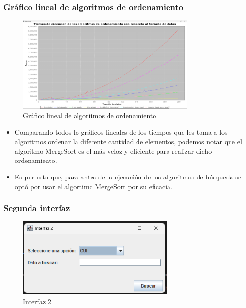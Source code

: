 \documentclass{article}
\begin{document}
    \subsubsection{Gráfico lineal de algoritmos de ordenamiento}
    
     \begin{figure}[H]
        \centering
	\includegraphics[width=0.8\textwidth,keepaspectratio]{img/Sort_Grafic.png}
        \caption{Gráfico lineal de algoritmos de ordenamiento}
    \end{figure}
    
    \begin{itemize}	
        \item Comparando todos lo gráficos lineales de los tiempos que les toma a los algoritmos ordenar la diferente cantidad de elementos, podemos notar que el algoritmo MergeSort es el más veloz y eficiente para realizar dicho ordenamiento.
        \item Es por esto que, para antes de la ejecución de los algoritmos de búsqueda se optó por usar el algortimo MergeSort por su eficacia. 
	\end{itemize}
    
    \subsubsection{Segunda interfaz}

     \begin{figure}[H]
        \centering
	\includegraphics[width=0.7\textwidth,keepaspectratio]{img/Interfaz2.png}
        \caption{Interfaz 2}
    \end{figure}
    
\end{document}
